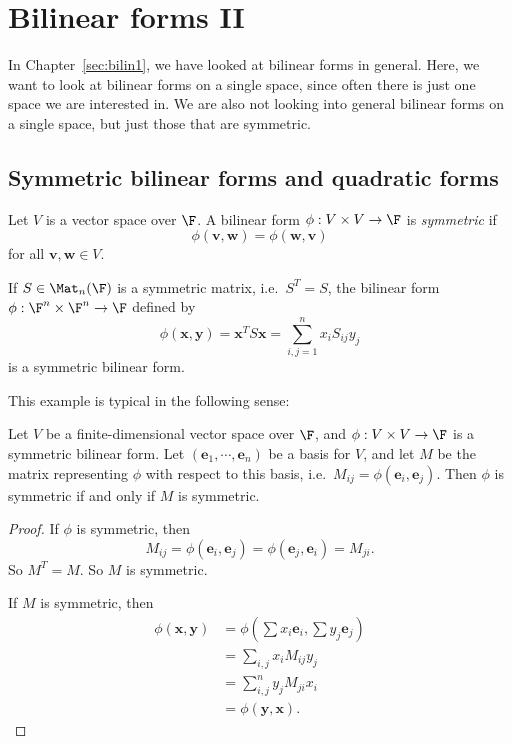 \documentclass[a4paper]{article}
\begin{document}
\section{Bilinear forms II}
\label{sec:bilin2}
In Chapter~\ref{sec:bilin1}, we have looked at bilinear forms in general. Here, we want to look at bilinear forms on a single space, since often there is just one space we are interested in. We are also not looking into general bilinear forms on a single space, but just those that are symmetric.

\subsection{Symmetric bilinear forms and quadratic forms}
\begin{defi}
  Let $V$ is a vector space over $\F$. A bilinear form $\phi: V \times V \to \F$ is \emph{symmetric} if
  \[
    \phi(\mathbf{v}, \mathbf{w}) = \phi(\mathbf{w}, \mathbf{v})
  \]
  for all $\mathbf{v}, \mathbf{w} \in V$.
\end{defi}

\begin{eg}
  If $S \in \Mat_n(\F)$ is a symmetric matrix, i.e.\ $S^T = S$, the bilinear form $\phi: \F^n \times \F^n \to \F$ defined by
  \[
    \phi(\mathbf{x}, \mathbf{y}) = \mathbf{x}^T S\mathbf{x} = \sum_{i, j = 1}^n x_i S_{ij} y_j
  \]
  is a symmetric bilinear form.
\end{eg}
This example is typical in the following sense:

\begin{lemma}
  Let $V$ be a finite-dimensional vector space over $\F$, and $\phi: V\times V \to \F$ is a symmetric bilinear form. Let $(\mathbf{e}_1, \cdots, \mathbf{e}_n)$ be a basis for $V$, and let $M$ be the matrix representing $\phi$ with respect to this basis, i.e.\ $M_{ij} = \phi(\mathbf{e}_i, \mathbf{e}_j)$. Then $\phi$ is symmetric if and only if $M$ is symmetric.
\end{lemma}

\begin{proof}
  If $\phi$ is symmetric, then
  \[
    M_{ij} = \phi(\mathbf{e}_i, \mathbf{e}_j) = \phi(\mathbf{e}_j, \mathbf{e}_i) = M_{ji}.
  \]
  So $M^T = M$. So $M$ is symmetric.

  If $M$ is symmetric, then
  \begin{align*}
    \phi(\mathbf{x}, \mathbf{y}) &= \phi\left(\sum x_i \mathbf{e}_i, \sum y_j \mathbf{e}_j\right)\\
    &= \sum_{i, j} x_i M_{ij} y_j\\
    &= \sum_{i, j}^n y_j M_{ji} x_i\\
    &= \phi(\mathbf{y}, \mathbf{x}).
  \end{align*}
\end{proof}
\end{document}
